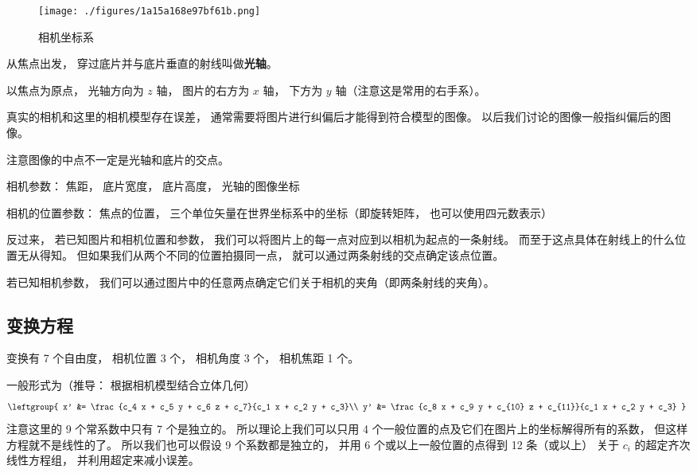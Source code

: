 
\begin{issues}
\issueDraft
\end{issues}


\begin{figure}[ht]
\centering
\texttt{[image: ./figures/1a15a168e97bf61b.png]}
\caption{相机坐标系} \label{fig_CamMdl_1}
\end{figure}

从焦点出发， 穿过底片并与底片垂直的射线叫做\textbf{光轴}。

以焦点为原点， 光轴方向为 $z$ 轴， 图片的右方为 $x$ 轴， 下方为 $y$ 轴（注意这是常用的右手系）。

真实的相机和这里的相机模型存在误差， 通常需要将图片进行纠偏后才能得到符合模型的图像。 以后我们讨论的图像一般指纠偏后的图像。

注意图像的中点不一定是光轴和底片的交点。

相机参数： 焦距， 底片宽度， 底片高度， 光轴的图像坐标

相机的位置参数： 焦点的位置， 三个单位矢量在世界坐标系中的坐标（即旋转矩阵， 也可以使用四元数表示）

反过来， 若已知图片和相机位置和参数， 我们可以将图片上的每一点对应到以相机为起点的一条射线。 而至于这点具体在射线上的什么位置无从得知。 但如果我们从两个不同的位置拍摄同一点， 就可以通过两条射线的交点确定该点位置。

若已知相机参数， 我们可以通过图片中的任意两点确定它们关于相机的夹角（即两条射线的夹角）。

\subsection{变换方程}
变换有 7 个自由度， 相机位置 3 个， 相机角度 3 个， 相机焦距 1 个。

一般形式为（推导： 根据相机模型结合立体几何）
\begin{equation}\label{eq_CamMdl_1}
\leftgroup{
x' &= \frac{c_4 x + c_5 y + c_6 z + c_7}{c_1 x + c_2 y + c_3}\\
y' &= \frac{c_8 x + c_9 y + c_{10} z + c_{11}}{c_1 x + c_2 y + c_3}
}~
\end{equation}
注意这里的 9 个常系数中只有 7 个是独立的。 所以理论上我们可以只用 4 个一般位置的点及它们在图片上的坐标解得所有的系数， 但这样方程就不是线性的了。 所以我们也可以假设 9 个系数都是独立的， 并用 6 个或以上一般位置的点得到 12 条（或以上） 关于 $c_i$ 的超定齐次线性方程组， 并利用超定来减小误差。

